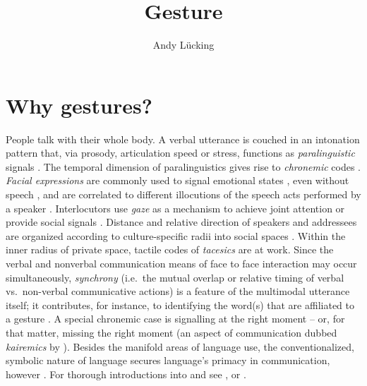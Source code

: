 \documentclass[output=paper
 	        ,biblatex
                ,babelshorthands
                ,newtxmath
                ,draftmode
                ,colorlinks, citecolor=brown
]{langscibook}
\author{Andy Lücking\affiliation{Universit\'{e} de Paris, Goethe-Universität Frankfurt}}
\title{Gesture}
\begin{document}
\maketitle
\label{chap-gesture}


\section{Why gestures?} 
\label{sec:why-gestures}

People talk with their whole body. 
%
A verbal utterance is couched in an intonation pattern that, via prosody, articulation speed or stress, functions as \emph{paralinguistic} signals \citep[e.g.][]{Birdwhistell:1970}. 
%
The temporal dimension of paralinguistics gives rise to \emph{chronemic} codes \citep{Poyatos:1975,Bruneau:1980}. \emph{Facial expressions} are commonly used to signal emotional states \citep{Ekman:Friesen:1978}, even without speech \citep{Argyle:1975}, and are correlated to different illocutions of the speech acts performed by a speaker \citep{Domaneschi:Passarelli:Chiorri:2017}.
%
Interlocutors use \emph{gaze} as a mechanism to achieve joint attention \citep{Argyle:Cook:1976} or provide social signals \citep{Kendon:1967}. 
%
Distance and relative direction of speakers and addressees are organized according to culture-specific radii into social spaces \citep[\emph{proxemics},][]{Hall:1968}. 
%
Within the inner radius of private space, tactile codes of \emph{tacesics} \citep{Kauffman:1971} are at work. 
%
Since the verbal and nonverbal communication means of face to face interaction may occur simultaneously, \emph{synchrony} (i.e.\ the mutual overlap or relative timing of verbal vs.\ non-verbal communicative actions) is a feature of the multimodal utterance itself; it contributes, for instance, to identifying the word(s) that are affiliated to a gesture \citep{Wiltshire:2007}. 
%
A special chronemic case is signalling at the right moment -- or, for that matter, missing the right moment (an aspect of communication dubbed \emph{kairemics} by \citealp[]{Luecking:Pfeiffer:2012}).
%
Besides the manifold areas of language use, the conventionalized, symbolic nature of language secures language's primacy in communication, however \citep{de:Ruiter:2004}.
%
For thorough introductions into  and  see \citet{Noeth:1990}, \citet{Posner:Robering:Sebeok:1997:2004} or \citet{Mueller:Cienki:Fricke:Ladewig:McNeill:Tessendorf:2013,Mueller:Cienki:Fricke:Ladewig:McNeill:Bressem:2014}.
\end{document}
